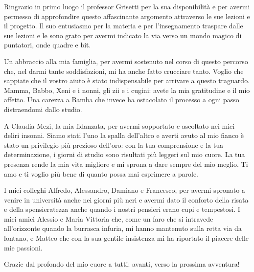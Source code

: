 \documentclass[noexaminfo]{sapthesis}
\begin{document}
\begin{acknowledgments}
Ringrazio in primo luogo il professor Grisetti per la sua disponibilità e per avermi permesso di approfondire questo affascinante argomento attraverso le sue lezioni e il progetto. Il suo entusiasmo per la materia e per l'insegnamento traspare dalle sue lezioni e le sono grato per avermi indicato la via verso un mondo magico di puntatori, onde quadre e bit.

Un abbraccio alla mia famiglia, per avermi sostenuto nel corso di questo percorso che, nel darmi tante soddisfazioni, mi ha anche fatto crucciare tanto. Voglio che sappiate che il vostro aiuto è stato indispensabile per arrivare a questo traguardo. Mamma, Babbo, Xeni e i nonni, gli zii e i cugini: avete la mia gratitudine e il mio affetto. Una carezza a Bamba che invece ha ostacolato il processo a ogni passo distraendomi dallo studio. 

A Claudia Mezi, la mia fidanzata, per avermi sopportato e ascoltato nei miei deliri insonni. Siamo stati l'uno la spalla dell'altro e averti avuto al mio fianco è stato un privilegio più prezioso dell'oro: con la tua comprensione e la tua determinazione, i giorni di studio sono risultati più leggeri sul mio cuore. La tua presenza rende la mia vita migliore e mi sprona a dare sempre del mio meglio. Ti amo e ti voglio più bene di quanto possa mai esprimere a parole.

I miei colleghi Alfredo, Alessandro, Damiano e Francesco, per avermi spronato a venire in università anche nei giorni più neri e avermi dato il conforto della risata e della spensieratezza anche quando i nostri pensieri erano cupi e tempestosi. I miei amici Alessio e Maria Vittoria che, come un faro che si intravede all'orizzonte quando la burrasca infuria, mi hanno mantenuto sulla retta via da lontano, e Matteo che con la sua gentile insistenza mi ha riportato il piacere delle mie passioni. 

Grazie dal profondo del mio cuore a tutti: avanti, verso la prossima avventura!
\end{acknowledgments}
\end{document}
